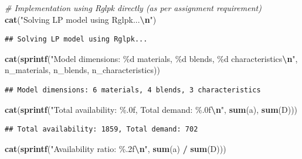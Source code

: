 \documentclass[
]{article}
\newenvironment{Shaded}{\begin{snugshade}}{\end{snugshade}}
\newcommand{\CommentTok}[1]{\textcolor[rgb]{0.56,0.35,0.01}{\textit{#1}}}
\newcommand{\FunctionTok}[1]{\textcolor[rgb]{0.13,0.29,0.53}{\textbf{#1}}}
\newcommand{\NormalTok}[1]{#1}
\newcommand{\SpecialCharTok}[1]{\textcolor[rgb]{0.81,0.36,0.00}{\textbf{#1}}}
\newcommand{\StringTok}[1]{\textcolor[rgb]{0.31,0.60,0.02}{#1}}
\begin{document}
\begin{Shaded}
\begin{Highlighting}[]
\CommentTok{\# Implementation using Rglpk directly (as per assignment requirement)}
\FunctionTok{cat}\NormalTok{(}\StringTok{"Solving LP model using Rglpk...}\SpecialCharTok{\textbackslash{}n}\StringTok{"}\NormalTok{)}
\end{Highlighting}
\end{Shaded}

\begin{verbatim}
## Solving LP model using Rglpk...
\end{verbatim}

\begin{Shaded}
\begin{Highlighting}[]
\FunctionTok{cat}\NormalTok{(}\FunctionTok{sprintf}\NormalTok{(}\StringTok{"Model dimensions: \%d materials, \%d blends, \%d characteristics}\SpecialCharTok{\textbackslash{}n}\StringTok{"}\NormalTok{, }
\NormalTok{            n\_materials, n\_blends, n\_characteristics))}
\end{Highlighting}
\end{Shaded}

\begin{verbatim}
## Model dimensions: 6 materials, 4 blends, 3 characteristics
\end{verbatim}

\begin{Shaded}
\begin{Highlighting}[]
\FunctionTok{cat}\NormalTok{(}\FunctionTok{sprintf}\NormalTok{(}\StringTok{"Total availability: \%.0f, Total demand: \%.0f}\SpecialCharTok{\textbackslash{}n}\StringTok{"}\NormalTok{, }
            \FunctionTok{sum}\NormalTok{(a), }\FunctionTok{sum}\NormalTok{(D)))}
\end{Highlighting}
\end{Shaded}

\begin{verbatim}
## Total availability: 1859, Total demand: 702
\end{verbatim}

\begin{Shaded}
\begin{Highlighting}[]
\FunctionTok{cat}\NormalTok{(}\FunctionTok{sprintf}\NormalTok{(}\StringTok{"Availability ratio: \%.2f}\SpecialCharTok{\textbackslash{}n}\StringTok{"}\NormalTok{, }\FunctionTok{sum}\NormalTok{(a) }\SpecialCharTok{/} \FunctionTok{sum}\NormalTok{(D)))}
\end{Highlighting}
\end{Shaded}
\end{document}
